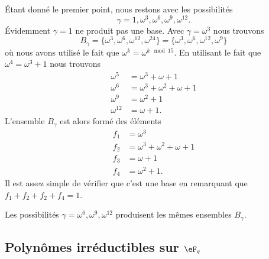 \begin{example}
\begin{enumerate}
		      Étant donné le premier point, nous restons avec les possibilités
		      \begin{equation}
			      \gamma=1,\omega^3,\omega^6,\omega^9,\omega^{12}.
		      \end{equation}
		      Évidemment \( \gamma=1\) ne produit pas une base. Avec \( \gamma=\omega^3\) nous trouvons
		      \begin{equation}
			      B_{\gamma}=\{ \omega^3,\omega^6,\omega^{12},\omega^{24} \}=\{ \omega^3,\omega^6,\omega^{12},\omega^9 \}
		      \end{equation}
		      où nous avons utilisé le fait que \( \omega^k=\omega^{k\mod 15}\). En utilisant le fait que \( \omega^4=\omega^3+1\) nous trouvons
		      \begin{subequations}
			      \begin{align}
				      \omega^5    & =\omega^3+\omega+1          \\
				      \omega^6    & =\omega^3+\omega^2+\omega+1 \\
				      \omega^9    & =\omega^2+1                 \\
				      \omega^{12} & =\omega+1.
			      \end{align}
		      \end{subequations}
		      L'ensemble \( B_{\gamma}\) est alors formé des éléments
		      \begin{subequations}
			      \begin{align}
				      f_1 & =\omega^3                   \\
				      f_2 & =\omega^3+\omega^2+\omega+1 \\
				      f_3 & =\omega+1                   \\
				      f_4 & =\omega^2+1.
			      \end{align}
		      \end{subequations}
		      Il est assez simple de vérifier que c'est une base en remarquant que \( f_1+f_2+f_2+f_4=1\).

		      Les possibilités \( \gamma=\omega^6,\omega^9,\omega^{12}\) produisent les mêmes ensembles \( B_{\gamma}\).
	\end{enumerate}
\end{example}

\subsection{Polynômes irréductibles sur \( \eF_q\)}

